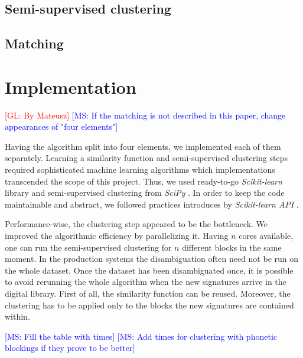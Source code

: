 \documentclass{article}
\newcommand{\glnote}[1]{\textcolor{red}{[GL: #1]}}
\newcommand{\msnote}[1]{\textcolor{blue}{[MS: #1]}}
\begin{document}

\subsection{Semi-supervised clustering}

\subsection{Matching}



\section{Implementation}
\label{implementation}

\glnote{By Mateusz}
\msnote{If the matching is not described in this paper, change appearances of "four elements"}

Having the algorithm split into four elements, we implemented each of them separately.
Learning a similarity function and semi-supervised clustering steps required sophisticated
machine learning algorithms which implementations transcended the scope of this project.
Thus, we used ready-to-go \textit{Scikit-learn} library \citep{scikit-learn} and
semi-supervised clustering from \textit{SciPy} \citep{scipy}. In order to keep the code
maintainable and abstract, we followed practices introduces by \textit{Scikit-learn API}
\citep{scikit-learn-API}.

Performance-wise, the clustering step appeared to be the bottleneck. We improved the
algorithmic efficiency by parallelizing it. Having $n$ cores available, one can run the
semi-supervised clustering for $n$ different blocks in the same moment. In the production
systems the disambiguation often need not be run on the whole dataset. Once the dataset has
been disambiguated once, it is possible to avoid rerunning the whole algorithm when the new
signatures arrive in the digital library. First of all, the similarity function can be
reused. Moreover, the clustering has to be applied only to the blocks the new signatures are
contained within.

\msnote{Fill the table with times}
\msnote{Add times for clustering with phonetic blockings if they prove to be better}
\end{document}
